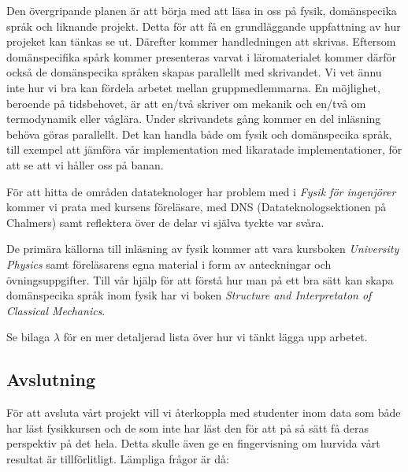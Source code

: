 \documentclass[12pt,a4paper]{article}
\begin{document}
Den övergripande planen är att börja med att läsa in oss på fysik, domänspecika språk och liknande projekt. Detta för att få en grundläggande uppfattning av hur projeket kan tänkas se ut. Därefter kommer handledningen att skrivas. Eftersom domänspecifika spårk kommer presenteras varvat i läromaterialet kommer därför också de domänspecika språken skapas parallellt med skrivandet. Vi vet ännu inte hur vi bra kan fördela arbetet mellan gruppmedlemmarna. En möjlighet, beroende på tidsbehovet, är att en/två skriver om mekanik och en/två om termodynamik eller våglära. Under skrivandets gång kommer en del inläsning behöva göras parallellt. Det kan handla både om fysik och domänspecika språk, till exempel att jämföra vår implementation med likaratade implementationer, för att se att vi håller oss på banan.

För att hitta de områden datateknologer har problem med i \textit{Fysik för ingenjörer} kommer vi prata med kursens föreläsare, med DNS (Datateknologsektionen på Chalmers) samt reflektera över de delar vi själva tyckte var svåra.

De primära källorna till inläsning av fysik kommer att vara kursboken \textit{University Physics}\cite{UP} samt föreläsarens egna material i form av anteckningar och övningsuppgifter. Till vår hjälp för att förstå hur man på ett bra sätt kan skapa domänspecika språk inom fysik har vi boken \textit{Structure and Interpretaton of Classical Mechanics}\cite{SICM}.

Se bilaga $\lambda$ för en mer detaljerad lista över hur vi tänkt lägga upp arbetet.


\subsection{Avslutning}

För att avsluta vårt projekt vill vi återkoppla med studenter inom data som både har läst fysikkursen och de som inte har läst den för att på så sätt få deras perspektiv på det hela. Detta skulle även ge en fingervisning om hurvida vårt resultat är tillförlitligt. Lämpliga frågor är då:
\end{document}
